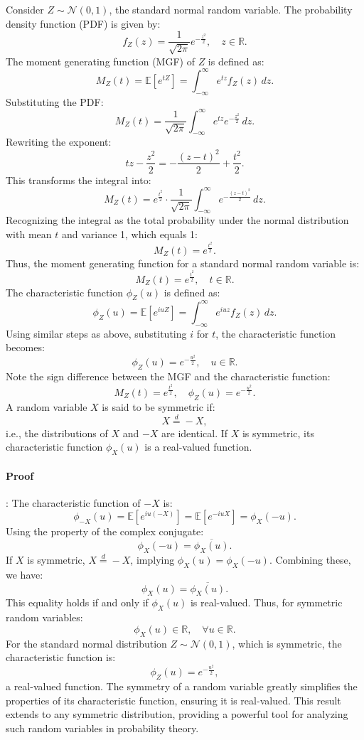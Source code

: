     Consider \( Z \sim \mathcal{N}(0, 1) \), the standard normal random variable. The probability density function (PDF) is given by:
    \[
    f_Z(z) = \frac{1}{\sqrt{2\pi}} e^{-\frac{z^2}{2}}, \quad z \in \mathbb{R}.
    \]
    The moment generating function (MGF) of \( Z \) is defined as:
    \[
    M_Z(t) = \mathbb{E}[e^{tZ}] = \int_{-\infty}^{\infty} e^{tz} f_Z(z) \, dz.
    \]
    Substituting the PDF:
    \[
    M_Z(t) = \frac{1}{\sqrt{2\pi}} \int_{-\infty}^\infty e^{tz} e^{-\frac{z^2}{2}} \, dz.
    \]
    Rewriting the exponent:
    \[
    tz - \frac{z^2}{2} = -\frac{(z - t)^2}{2} + \frac{t^2}{2}.
    \]
    This transforms the integral into:
    \[
    M_Z(t) = e^{\frac{t^2}{2}} \cdot \frac{1}{\sqrt{2\pi}} \int_{-\infty}^\infty e^{-\frac{(z - t)^2}{2}} \, dz.
    \]
    Recognizing the integral as the total probability under the normal distribution with mean \( t \) and variance 1, which equals 1:
    \[
    M_Z(t) = e^{\frac{t^2}{2}}.
    \]
    Thus, the moment generating function for a standard normal random variable is:
    \[
    M_Z(t) = e^{\frac{t^2}{2}}, \quad t \in \mathbb{R}.
    \]
    The characteristic function \( \phi_Z(u) \) is defined as:
    \[
    \phi_Z(u) = \mathbb{E}[e^{iuZ}] = \int_{-\infty}^\infty e^{iuz} f_Z(z) \, dz.
    \]
    Using similar steps as above, substituting \( i \) for \( t \), the characteristic function becomes:
    \[
    \phi_Z(u) = e^{-\frac{u^2}{2}}, \quad u \in \mathbb{R}.
    \]
    Note the sign difference between the MGF and the characteristic function:
    \[
    M_Z(t) = e^{\frac{t^2}{2}}, \quad \phi_Z(u) = e^{-\frac{u^2}{2}}.
    \]
    A random variable \( X \) is said to be symmetric if:
    \[
    X \stackrel{d}{=} -X,
    \]
    i.e., the distributions of \( X \) and \( -X \) are identical. \newline
    If \( X \) is symmetric, its characteristic function \( \phi_X(u) \) is a real-valued function.
    \paragraph{Proof}: The characteristic function of \( -X \) is:
    \[
    \phi_{-X}(u) = \mathbb{E}[e^{iu(-X)}] = \mathbb{E}[e^{-iuX}] = \phi_X(-u).
    \]
    Using the property of the complex conjugate:
    \[
    \phi_X(-u) = \overline{\phi_X(u)}.
    \]
    If \( X \) is symmetric, \( X \stackrel{d}{=} -X \), implying \( \phi_X(u) = \phi_X(-u) \). Combining these, we have:
    \[
    \phi_X(u) = \overline{\phi_X(u)}.
    \]
    This equality holds if and only if \( \phi_X(u) \) is real-valued. Thus, for symmetric random variables:
    \[
    \phi_X(u) \in \mathbb{R}, \quad \forall u \in \mathbb{R}.
    \]
    For the standard normal distribution \( Z \sim \mathcal{N}(0, 1) \), which is symmetric, the characteristic function is:
    \[
    \phi_Z(u) = e^{-\frac{u^2}{2}},
    \]
    a real-valued function. The symmetry of a random variable greatly simplifies the properties of its characteristic function, ensuring it is real-valued. This result extends to any symmetric distribution, providing a powerful tool for analyzing such random variables in probability theory.
    
